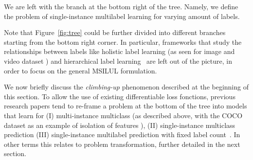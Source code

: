 We are left with the branch at the bottom right of the tree. Namely, we define the problem of single-instance multilabel learning for varying amount of labels.

Note that Figure~\ref{fig:tree} could be further divided into different branches starting from the bottom right corner. In particular, frameworks that study the relationships between labels like holistic label learning (as seen for image \cite{holisticImageDescriptors,holisticLungs} and video dataset \cite{holisticVideoData} ) and hierarchical label learning~\cite{activeLearningMultiLabel, HARAM} are left out of the picture, in order to focus on the general MSILUL formulation. 

We now briefly discuss the \emph{climbing-up} phenomenon described at the beginning of this section. To allow the use of existing differentiable loss fonctions, previous research papers tend to re-frame a problem at the bottom of the tree into models that learn for (I) multi-instance multiclass (as described above, with the COCO dataset as an example of isolation of features \cite{COCO}), (II) single-instance multiclass prediction \cite{multiclass} (III) single-instance multilabel prediction with fixed label count~\cite{threshForF1}. In other terms this relates to problem transformation, further detailed in the next section.












